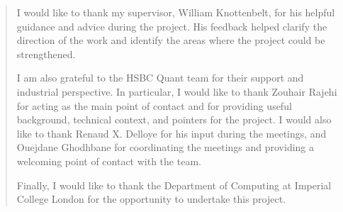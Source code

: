 \documentclass[a4paper, twoside]{report}
\begin{document}
\renewcommand{\abstractname}{Acknowledgements}
\begin{abstract}
I would like to thank my supervisor, William Knottenbelt, for his helpful guidance and advice during the project. His feedback helped clarify the direction of the work and identify the areas where the project could be strengthened.

I am also grateful to the HSBC Quant team for their support and industrial perspective. In particular, I would like to thank Zouhair Rajehi for acting as the main point of contact and for providing useful background, technical context, and pointers for the project. I would also like to thank Renaud X. Delloye for his input during the meetings, and Ouejdane Ghodhbane for coordinating the meetings and providing a welcoming point of contact with the team.

Finally, I would like to thank the Department of Computing at Imperial College London for the opportunity to undertake this project.
\end{abstract}

\tableofcontents
\listoffigures
\listoftables





















\end{document}

